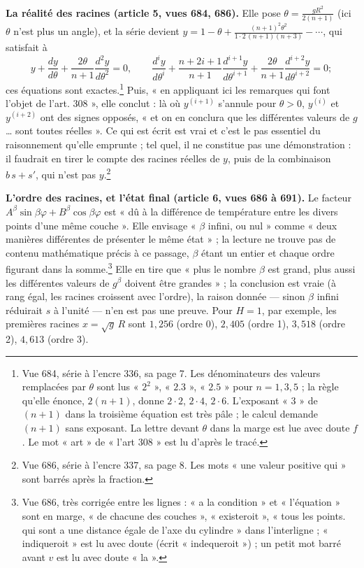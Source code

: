 \documentclass[11pt,a4paper]{article}
\begin{document}
\textbf{La réalité des racines (article 5, vues 684, 686).} Elle pose $\theta =
\frac{gR^2}{2(n+1)}$ (ici $\theta$ n'est plus un angle), et la série devient $y
= 1 - \theta + \frac{(n+1)^2\theta^2}{1\cdot2\,(n+1)(n+3)} - \cdots$, qui
satisfait à
\[
y + \frac{dy}{d\theta} + \frac{2\theta}{n+1}\frac{d^2y}{d\theta^2} = 0,
\qquad
\frac{d^iy}{d\theta^i} + \frac{n+2i+1}{n+1}\frac{d^{i+1}y}{d\theta^{i+1}} +
\frac{2\theta}{n+1}\frac{d^{i+2}y}{d\theta^{i+2}} = 0 ;
\]
ces équations sont exactes.\footnote{Vue 684, série à l'encre 336, sa page 7.
Les dénominateurs des valeurs remplacées par $\theta$ sont lus « $2^2$ »,
« $2.3$ », « $2.5$ » pour $n = 1, 3, 5$ ; la règle qu'elle énonce, $2(n+1)$,
donne $2\cdot2$, $2\cdot4$, $2\cdot6$. L'exposant « 3 » de $(n+1)$ dans la
troisième équation est très pâle ; le calcul demande $(n+1)$ sans exposant. La
lettre devant $\theta$ dans la marge est lue avec doute $f$. Le mot « art »
de « l'art 308 » est lu d'après le tracé.} Puis, « en appliquant ici les
remarques qui font l'objet de l'art. 308 », elle conclut : là où
$y^{(i+1)}$ s'annule pour $\theta > 0$, $y^{(i)}$ et $y^{(i+2)}$ ont des signes
opposés, « et on en conclura que les différentes valeurs de $g$ … sont toutes
réelles ». Ce qui est écrit est vrai et c'est le pas essentiel du raisonnement
qu'elle emprunte ; tel quel, il ne constitue pas une démonstration : il
faudrait en tirer le compte des racines réelles de $y$, puis de la combinaison
$b\,s + s'$, qui n'est pas $y$.\footnote{Vue 686, série à l'encre 337, sa page
8. Les mots « une valeur positive qui » sont barrés après la fraction.}

\textbf{L'ordre des racines, et l'état final (article 6, vues 686 à 691).} Le
facteur $A^\beta\sin\beta\varphi + B^\beta\cos\beta\varphi$ est « dû à la
différence de température entre les divers points d'une même couche ». Elle
envisage « $\beta$ infini, ou nul » comme « deux manières différentes de
présenter le même état » ; la lecture ne trouve pas de contenu mathématique
précis à ce passage, $\beta$ étant un entier et chaque ordre figurant dans la
somme.\footnote{Vue 686, très corrigée entre les lignes : « a la condition » et
« l'équation » sont en marge, « de chacune des couches », « existeroit »,
« tous les points. qui sont a une distance égale de l'axe du cylindre » dans
l'interligne ; « indiqueroit » est lu avec doute (écrit « indequeroit ») ; un
petit mot barré avant $v$ est lu avec doute « la ».} Elle en tire que
« plus le nombre $\beta$ est grand, plus aussi les différentes valeurs de
$g^\beta$ doivent être grandes » ; la conclusion est vraie (à rang égal, les
racines croissent avec l'ordre), la raison donnée — sinon $\beta$ infini
réduirait $s$ à l'unité — n'en est pas une preuve. Pour $H = 1$, par exemple,
les premières racines $x = \sqrt g\,R$ sont $1{,}256$ (ordre 0), $2{,}405$
(ordre 1), $3{,}518$ (ordre 2), $4{,}613$ (ordre 3).
\end{document}
